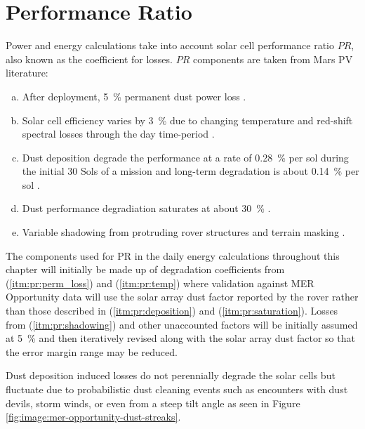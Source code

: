 \section{Performance Ratio}
\label{sec:PowerAndEnergyPredictions:PerformanceRatio}
Power and energy calculations take into account solar cell performance ratio $PR$, also known as the coefficient for losses. $PR$ components are taken from Mars \ac{PV} literature:

\begin{enumerate}[(a)]
  \item\label{itm:pr:perm_loss}After deployment, \SI{5}{\percent} permanent dust power loss .
  \item\label{itm:pr:temp}Solar cell efficiency varies by \SI{3}{\percent} due to changing temperature and red-shift spectral losses through the day time-period .
  \item\label{itm:pr:deposition}Dust deposition degrade the performance at a rate of \SI{0.28}{\percent} per sol during the initial 30 Sols of a mission and long-term degradation is about \SI{0.14}{\percent} per sol .
  \item\label{itm:pr:saturation}Dust performance degradiation saturates at about \SI{30}{\percent} .
  \item\label{itm:pr:shadowing}Variable shadowing from protruding rover structures  and terrain masking .
\end{enumerate}

The components used for \ac{PR} in the daily energy calculations throughout this chapter will initially be made up of degradation coefficients from (\ref{itm:pr:perm_loss}) and (\ref{itm:pr:temp}) where validation against \ac{MER} Opportunity data will use the solar array dust factor reported by the rover rather than those described in (\ref{itm:pr:deposition}) and (\ref{itm:pr:saturation}). Losses from (\ref{itm:pr:shadowing}) and other unaccounted factors will be initially assumed at \SI{5}{\percent} and then iteratively revised along with the solar array dust factor so that the error margin range may be reduced.

Dust deposition induced losses do not perennially degrade the solar cells but fluctuate due to probabilistic dust cleaning events such as encounters with dust devils, storm winds, or even from a steep tilt angle as seen in Figure \ref{fig:image:mer-opportunity-dust-streaks}.

